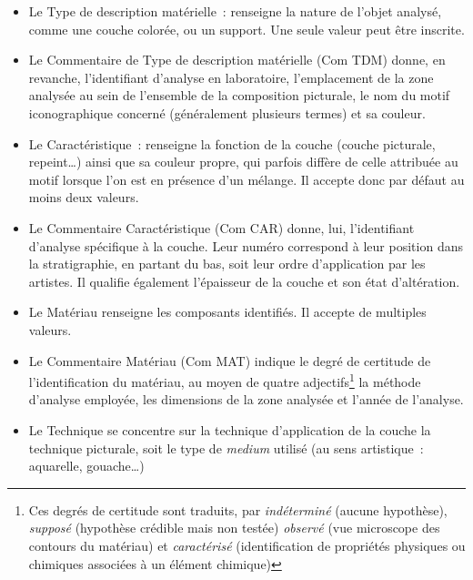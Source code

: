 \documentclass[a4paper,12pt, twoside]{book}
\begin{document}
\begin{itemize}
\item \textsf{Le Type de description matérielle}~: renseigne la nature de l’objet analysé, comme une couche colorée, ou un support. Une seule valeur peut être inscrite.\\

\item \textsf{Le Commentaire de Type de description matérielle} (Com TDM) donne, en revanche, l’identifiant d’analyse en laboratoire, l’emplacement de la zone analysée au sein de l’ensemble de la composition picturale, le nom du motif iconographique concerné (généralement plusieurs termes) et sa couleur.\\

\item \textsf{Le Caractéristique}~: renseigne la fonction de la couche (couche picturale, repeint…) ainsi que sa couleur propre, qui parfois diffère de celle attribuée au motif lorsque l’on est en présence d’un mélange. Il accepte donc par défaut au moins deux valeurs.\\

\item \textsf{Le Commentaire Caractéristique} (Com CAR) donne, lui, l’identifiant d’analyse spécifique à la couche. Leur numéro correspond à leur position dans la stratigraphie, en partant du bas, soit leur ordre d’application par les artistes. Il qualifie également l’épaisseur de la couche et son état d’altération.\\

\item \textsf{Le Matériau} renseigne les composants identifiés. Il accepte de multiples valeurs.\\

\item \textsf{Le Commentaire Matériau} (Com MAT) indique le degré de certitude de l’identification du matériau, au moyen de quatre adjectifs\footnote{Ces degrés de certitude sont traduits, par \textit{indéterminé} (aucune hypothèse), \textit{supposé} (hypothèse crédible mais non testée) \textit{observé} (vue microscope des contours du matériau) et \textit{caractérisé} (identification de propriétés physiques ou chimiques associées à un élément chimique)} la méthode d’analyse employée, les dimensions de la zone analysée et l’année de l’analyse.\\

\item \textsf{Le Technique} se concentre sur la technique d’application de la couche la technique picturale, soit le type de \textit{medium} utilisé (au sens artistique~: aquarelle, gouache…)\\


\end{itemize}
\end{document}
